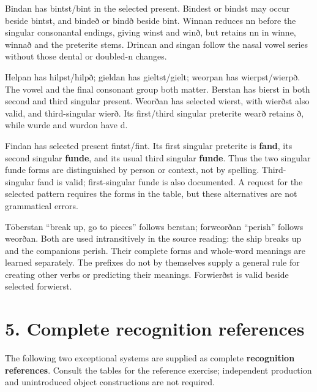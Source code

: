 \par\endgroup
Bindan has bintst/\allowbreak{}bint in the selected present. Bindest or bindst may occur beside bintst, and bindeð or bindð beside bint. Winnan reduces nn before the singular consonantal endings, giving winst and winð, but retains nn in winne, winnað and the preterite stems. Drincan and singan follow the nasal vowel series without those dental or doubled-n changes.

Helpan has hilpst/\allowbreak{}hilpð; gieldan has gieltst/\allowbreak{}gielt; weorpan has wierpst/\allowbreak{}wierpð. The vowel and the final consonant group both matter. Berstan has bierst in both second and third singular present. Weorðan has selected wierst, with wierðst also valid, and third-singular wierð. Its first/\allowbreak{}third singular preterite wearð retains ð, while wurde and wurdon have d.

Findan has selected present fintst/\allowbreak{}fint. Its first singular preterite is \textbf{fand}, its second singular \textbf{funde}, and its usual third singular \textbf{funde}. Thus the two singular funde forms are distinguished by person or context, not by spelling. Third-singular fand is valid; first-singular funde is also documented. A request for the selected pattern requires the forms in the table, but these alternatives are not grammatical errors.

Tōberstan “break up, go to pieces” follows berstan; forweorðan “perish” follows weorðan. Both are used intransitively in the source reading: the ship breaks up and the companions perish. Their complete forms and whole-word meanings are learned separately. The prefixes do not by themselves supply a general rule for creating other verbs or predicting their meanings. Forwierðst is valid beside selected forwierst.

\section*{5. Complete recognition references}

The following two exceptional systems are supplied as complete \textbf{recognition references}. Consult the tables for the reference exercise; independent production and unintroduced object constructions are not required.

